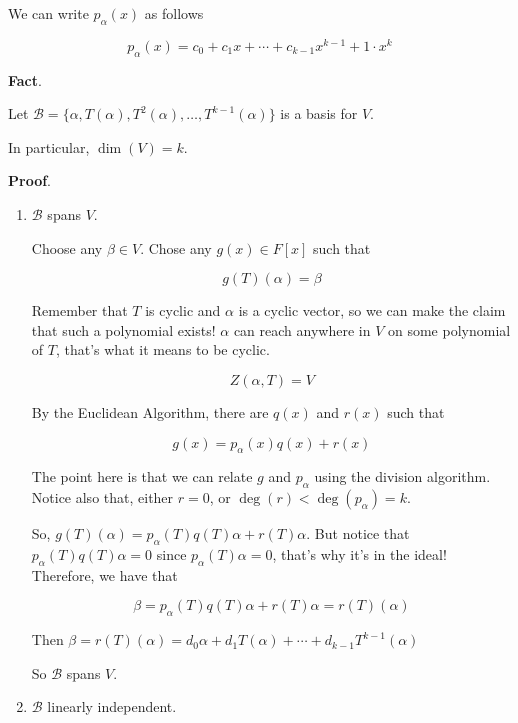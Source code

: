 \documentclass[12pt]{article}
\def\B{\mathcal B}
\begin{document}
  We can write $p_\alpha(x)$ as follows

  \[
    p_\alpha(x) = c_0 + c_1 x + \cdots + c_{k - 1} x^{k - 1} + 1 \cdot x^k
  \]
  

  {\bf Fact}.

  Let $\B = \{\alpha, T(\alpha), T^2(\alpha), \dots, T^{k - 1}(\alpha)\}$ is a
  basis for $V$.


  In particular, $\dim(V) = k$.

  {\bf Proof}.

  \begin{enumerate}
    \item $\B$ spans $V$.

      Choose any $\beta \in V$. Chose any $g(x) \in F[x]$ such that

      \[
        g(T)(\alpha) = \beta
      \]

      Remember that $T$ is cyclic and $\alpha$ is a cyclic vector, so we can
      make the claim that such a polynomial exists! $\alpha$ can reach anywhere
      in $V$ on some polynomial of $T$, that's what it means to be cyclic.

      \[
        Z(\alpha, T) = V
      \]

      By the Euclidean Algorithm, there are $q(x)$ and $r(x)$ such that

      \[
        g(x) = p_\alpha(x) q(x) + r(x)
      \]

      The point here is that we can relate $g$ and $p_\alpha$ using the division
      algorithm. Notice also that, either $r = 0$, or $\deg(r) < \deg(p_\alpha)
      = k$.

      So, $g(T)(\alpha) = p_\alpha(T) q(T) \alpha + r(T) \alpha$. But notice
      that $p_\alpha(T) q(T) \alpha = 0$ since $p_\alpha(T) \alpha = 0$, that's
      why it's in the ideal! Therefore, we have that

      \[
        \beta = p_\alpha(T) q(T) \alpha + r(T) \alpha = r(T)(\alpha)
      \]

      Then $\beta = r(T)(\alpha) = d_0 \alpha + d_1 T(\alpha) + \cdots + d_{k -
      1} T^{k - 1}(\alpha)$

      So $\B$ spans $V$.

    \item $\B$ linearly independent.


\end{enumerate}
\end{document}
